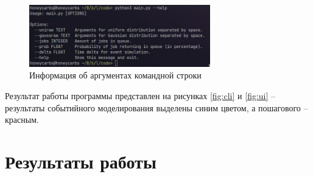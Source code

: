 \begin{figure}[H]
	\centering
	\includegraphics[width=0.7\textwidth]{assets/help.jpg}
	\caption{Информация об аргументах командной строки}
	\label{fig:help}
\end{figure}




Результат работы программы представлен на рисунках \ref{fig:cli} и \ref{fig:ui} -- результаты событийного моделирования выделены синим цветом, а пошагового -- красным.

\section{Результаты работы}


